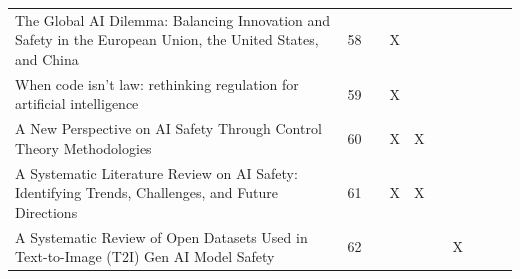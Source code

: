 \begin{landscape}
\begin{longtable}{|p{17cm}|c|c|c|c|c|c|c|c|c|}
		The Global AI Dilemma: Balancing Innovation and Safety in the European Union, the United States, and China                                              & 58          &                                    & X                                                         &                                                       &                                                            &                                           &                                              &                                                    &                                    \\
		When code isn't law: rethinking regulation for artificial intelligence                                                                                  & 59          &                                    & X                                                         &                                                       &                                                            &                                           &                                              &                                                    &                                    \\
		A New Perspective on AI Safety Through Control Theory Methodologies                                                                                     & 60          &                                    & X                                                         & X                                                     &                                                            &                                           &                                              &                                                    &                                    \\
		A Systematic Literature Review on AI Safety: Identifying Trends, Challenges, and Future Directions                                                      & 61          &                                    & X                                                         & X                                                     &                                                            &                                           &                                              &                                                    &                                    \\
		A Systematic Review of Open Datasets Used in Text-to-Image (T2I) Gen AI Model Safety                                                                    & 62          &                                    &                                                           &                                                       &                                                            & X                                         &                                              &                                                    &                                    \\

\end{longtable}
\end{landscape}
